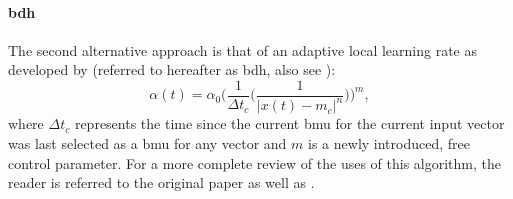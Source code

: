 \paragraph*{\gls{bdh}}
\label{para:alpha_bdh}
The second alternative approach is that of an adaptive local learning rate as
developed by \citet{bauer1996} (referred to hereafter as \gls{bdh}, also see \citet{merenyi2007}):
\begin{equation}
  \alpha(t) = \alpha_0 \bigg(\frac{1}{\Delta{t_c}}\bigg(\frac{1}{|x(t)-m_c|^n}\bigg)\bigg)^m,
\end{equation}
where $\Delta{t_c}$ represents the time since the current \gls{bmu} for the
current input vector was last selected as a \gls{bmu} for any vector and $m$ is
a newly introduced, free control parameter. For a more complete review of the
uses of this algorithm, the reader is referred to the original paper
\citep{bauer1996} as well as \citet{merenyi2007}.
